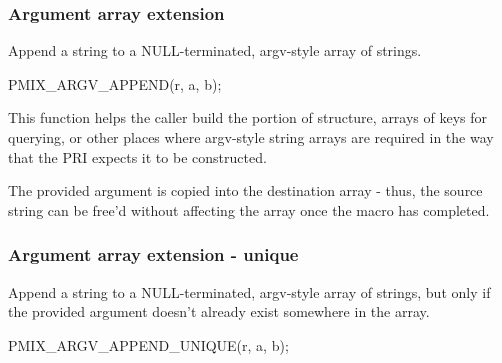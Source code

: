 \subsubsection{Argument array extension}

\summary

Append a string to a NULL-terminated, argv-style array of strings.

\cspecificstart
\begin{codepar}
PMIX_ARGV_APPEND(r, a, b);
\end{codepar}
\cspecificend

\begin{arglist}
\end{arglist}

\descr

This function helps the caller build the  portion of  structure, arrays of keys for querying, or other places where argv-style string arrays are required in the way that the \ac{PRI} expects it to be constructed.

\adviceuserstart
The provided argument is copied into the destination array - thus, the source string can be free'd without affecting the array once the macro has completed.
\adviceuserend

\subsubsection{Argument array extension - unique}

\summary

Append a string to a NULL-terminated, argv-style array of strings, but only if the provided argument doesn't already exist somewhere in the array.

\cspecificstart
\begin{codepar}
PMIX_ARGV_APPEND_UNIQUE(r, a, b);
\end{codepar}
\cspecificend

\begin{arglist}
\end{arglist}


